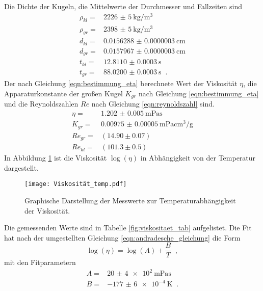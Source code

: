Die Dichte der Kugeln, die Mittelwerte der Durchmesser und Fallzeiten sind
\begin{align*}
  \rho_{kl}=&\SI[per-mode=fraction]{2226(5)}{\kilo\gram\per\cubic\meter}\\
  \rho_{gr}=&\SI[per-mode=fraction]{2398(5)}{\kilo\gram\per\cubic\meter}\\
  d_{kl}=&\SI[per-mode=fraction]{0.0156288(3)}{\centi\meter}\\
  d_{gr}=&\SI[per-mode=fraction]{0.0157967(3)}{\centi\meter}\\
  t_{kl}=&\SI[per-mode=fraction]{12.8110(3)}{\second}\\
  t_{gr}=&\SI[per-mode=fraction]{88.0200(3)}{\second}\;\;.
\end{align*}
Der nach Gleichung \eqref{eqn:bestimmung_eta} berechnete Wert der Viskosität $\eta$, die Apparaturkonstante der
großen Kugel $K_{gr}$ nach Gleichung \eqref{eqn:bestimmung_eta} und die Reynoldszahlen $Re$ nach Gleichung
\eqref{eqn:reynoldszahl} sind.
\begin{align*}
  \eta=&\SI{1.202(5)}{\meter\pascal\second}\\
  K_{gr}=&\SI[per-mode=fraction]{0.00975(5)}{\meter\pascal\centi\cubic\meter\per\gram}\\
  Re_{gr}=&(14.90\pm0.07)\\
  Re_{kl}=&(101.3\pm0.5)
  \label{eqn:etaKRE}
\end{align*}
In Abbildung \ref{fig:Viskositaet} ist die Viskosität $\log(\eta)$
in Abhängigkeit von der Temperatur dargestellt.
\begin{figure}
  \centering
  \texttt{[image: Viskosität\_temp.pdf]}
  \caption{Graphische Darstellung der Messwerte zur Temperaturabhängigkeit der Viskosität.}
  \label{fig:Viskositaet}
\end{figure}
Die gemessenden Werte sind in Tabelle \ref{fig:viskositaet_tab} aufgelistet. Die Fit hat
nach der umgestellten Gleichung \eqref{eqn:andradesche_gleichung} die Form
\begin{equation}
  \log(\eta)=\log(A)+\frac{B}{T}\;\;,
\end{equation}
mit den Fitparametern
\begin{align*}
  A=&\SI{20(4)e2}{\meter\pascal\second}\\
  B=&\SI[per-mode=fraction]{-177(6)e-4}{\kelvin}\;\;.
\end{align*}
